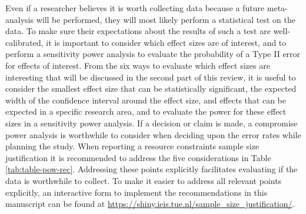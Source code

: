 \documentclass[
  english,
  ,jou,floatsintext]{apa6}
\begin{document}
Even if a researcher believes it is worth collecting data because a future meta-analysis will be performed, they will most likely perform a statistical test on the data. To make sure their expectations about the results of such a test are well-calibrated, it is important to consider which effect sizes are of interest, and to perform a sensitivity power analysis to evaluate the probability of a Type II error for effects of interest. From the six ways to evaluate which effect sizes are interesting that will be discussed in the second part of this review, it is useful to consider the smallest effect size that can be statistically significant, the expected width of the confidence interval around the effect size, and effects that can be expected in a specific research area, and to evaluate the power for these effect sizes in a sensitivity power analysis. If a decision or claim is made, a compromise power analysis is worthwhile to consider when deciding upon the error rates while planning the study. When reporting a resource constraints sample size justification it is recommended to address the five considerations in Table \ref{tab:table-pow-rec}. Addressing these points explicitly facilitates evaluating if the data is worthwhile to collect. To make it easier to address all relevant points explicitly, an interactive form to implement the recommendations in this manuscript can be found at \url{https://shiny.ieis.tue.nl/sample_size_justification/}.
\end{document}
